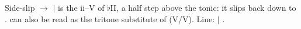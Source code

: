 \begin{patternbox}{Side-slip   $\to$ }{  $|$ }
  is the ii--V of $\flat$II, a half step above the tonic:
it slips back down to .  can also be read as the tritone
substitute of  (V/V). Line:  $|$ .
\patternwhereline
\end{patternbox}
